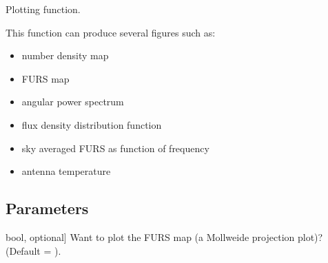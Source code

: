 \documentclass[letterpaper,10pt,english]{sphinxmanual}
\begin{document}
\begin{fulllineitems}

\begin{fulllineitems}
\label{\detokenize{api:furs.furs.visual}}
\pysigstartsignatures
{}
\pysigstopsignatures
\sphinxAtStartPar
Plotting function.

\sphinxAtStartPar
This function can produce several figures such as:\sphinxhyphen{}
\begin{itemize}
\item {} 
\sphinxAtStartPar
number density map

\item {} 
\sphinxAtStartPar
FURS map

\item {} 
\sphinxAtStartPar
angular power spectrum

\item {} 
\sphinxAtStartPar
flux density distribution function

\item {} 
\sphinxAtStartPar
sky averaged FURS as function of frequency

\item {} 
\sphinxAtStartPar
antenna temperature

\end{itemize}


\subsection{Parameters}
\label{\detokenize{api:id9}}\begin{description}
\sphinxlineitem{t\_skymap}{[}bool, optional{]}
\sphinxAtStartPar
Want to plot the FURS map (a Mollweide projection plot)? (Default = ).


\end{description}
\end{fulllineitems}
\end{fulllineitems}
\end{document}
